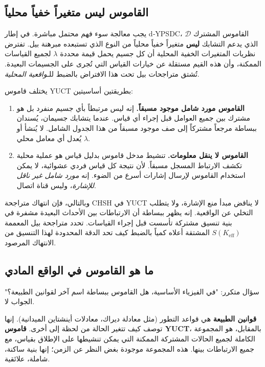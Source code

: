 \documentclass[12pt,a4paper]{article}
\theoremstyle{remark}
\begin{document}
	\subsection*{القاموس ليس متغيراً خفياً محلياً}
	
	يجب معالجة سوء فهم محتمل مباشرة. في إطار d‑YPSDC، القاموس المشترك \(\mathcal{D}\) الذي يدعم التشابك \textbf{ليس} متغيراً خفياً محلياً من النوع الذي تستبعده مبرهنة بيل. تفترض نظريات المتغيرات الخفية المحلية أن كل جسيم يحمل قيمة محددة \(\lambda\) لجميع القياسات الممكنة، وأن هذه القيم مستقلة عن خيارات القياس التي تُجرى على الجسيمات البعيدة. تُشتق متراجحات بيل تحت هذا الافتراض بالضبط للـ\emph{واقعية المحلية}.
	
	يختلف قاموس YUCT بطريقتين أساسيتين:
	
	\begin{enumerate}[leftmargin=*]
		\item \textbf{القاموس مورد شامل موجود مسبقاً.}
		إنه ليس مرتبطاً بأي جسيم منفرد بل هو مشترك بين جميع العوامل قبل إجراء أي قياس. عندما يتشابك جسيمان، يُسندان ببساطة مرجعاً مشتركاً إلى صف موجود مسبقاً من هذا الجدول الشامل. لا يُنشأ أو يُعدل أي معامل محلي \(\lambda\).
		
		\item \textbf{القاموس لا ينقل معلومات.}
		تنشيط مدخل قاموس بدليل قياس هو عملية محلية تكشف الارتباط المسجل مسبقاً. لأن نتيجة كل قياس فردي عشوائية، لا يمكن استخدام القاموس لإرسال إشارات أسرع من الضوء. إنه \emph{مورد شامل غير ناقل للإشارة}، وليس قناة اتصال.
	\end{enumerate}
	
	وبالتالي، فإن انتهاك متراجحة CHSH في YUCT لا يناقض مبدأ منع الإشارة، ولا يتطلب التخلي عن الواقعية. إنه يظهر ببساطة أن الارتباطات بين الأحداث البعيدة مشفرة في بنية تنسيق مشتركة تأسست قبل إجراء القياسات. تحدد متراجحة بيل المعممة \(S(K_{\mathrm{eff}})\) المشتقة أعلاه كمياً بالضبط كيف تحد الدقة المحدودة لهذا التنسيق من الانتهاك المرصود.
	
	\subsection*{ما هو القاموس في الواقع المادي}
	
	سؤال متكرر: "في الفيزياء الأساسية، هل القاموس ببساطة اسم آخر لقوانين الطبيعة؟" الجواب لا.
	
	\textbf{قوانين الطبيعة} هي قواعد التطور (مثل معادلة ديراك، معادلات أينشتاين الميدانية). إنها توصف كيف تتغير الحالة من لحظة إلى أخرى. \textbf{قاموس YUCT}، بالمقابل، هو المجموعة الكاملة لجميع الحالات المشتركة الممكنة التي يمكن تنشيطها على الإطلاق بقياس، مع جميع الارتباطات بينها. هذه المجموعة موجودة بغض النظر عن الزمن؛ إنها بنية ساكنة، شاملة، علائقية.
	
\end{document}
